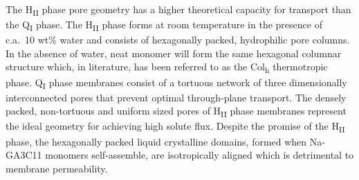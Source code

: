 \documentclass[journal=jpcbfk,manuscript=article]{achemso}
\begin{document}
  The H\textsubscript{II} phase pore geometry has a higher theoretical capacity
  for transport than the Q\textsubscript{I} phase. The H\textsubscript{II} phase forms
  at room temperature in the presence of c.a.~10 wt\% water and consists of hexagonally
  packed, hydrophilic pore columns\cite{smith_ordered_1997}. In the absence of
  water, neat monomer will form the same hexagonal columnar structure which, in
  literature, has been referred to as the Col\textsubscript{h} thermotropic
  phase\cite{feng_scalable_2014}. 
  Q\textsubscript{I} phase membranes consist of a tortuous network of three dimensionally 
  interconnected pores that prevent optimal through-plane transport. The densely packed, 
  non-tortuous and uniform sized pores of H\textsubscript{II} phase membranes represent
  the ideal geometry for achieving high solute flux\cite{matyka_tortuosity-porosity_2008}.
  Despite the promise of the H\textsubscript{II} phase, the hexagonally packed
  liquid crystalline domains, formed when Na-GA3C11 monomers self-assemble, are
  isotropically aligned which is detrimental to membrane permeability. 

\end{document}
